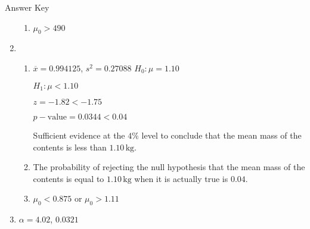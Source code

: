 \documentclass[11pt,a4paper]{book}
\begin{document}
\begin{assignment}{Answer Key}
\begin{enumerate}
\begin{enumerate}[label=(\alph*)]
\item $\mu_{0}>490$
\end{enumerate}

\item 
\begin{enumerate}[label=(\alph*)] 
\item $\overline{x}=0.994125$, $s^{2}=0.27088$
 $H_{0}:\mu=1.10$

$H_{1}:\mu<1.10$

$z=-1.82<-1.75$

$p-\text{value}=0.0344<0.04$

Sufficient evidence at the $4\%$ level to conclude that the mean
mass of the contents is less than $1.10\,\text{kg}$.

\item The probability of rejecting the null hypothesis that the mean mass of the contents is equal to $1.10\,\text{kg}$ when it is actually
true is $0.04$.

\item $\mu_{0}<0.875$ or $\mu_{0}>1.11$

\end{enumerate}

\item $\alpha=4.02$, $0.0321$



\end{enumerate}


\end{assignment}
\end{document}
